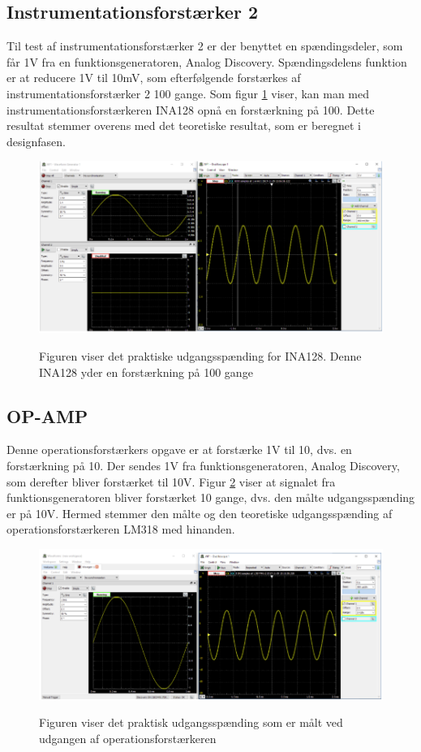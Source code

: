 \subsection{Instrumentationsforstærker 2}

Til test af instrumentationsforstærker 2 er der benyttet en spændingsdeler, som får 1V fra en funktionsgeneratoren, Analog Discovery. Spændingsdelens funktion er at reducere 1V til 10mV, som efterfølgende forstærkes af instrumentationsforstærker 2 100 gange. Som figur \ref{TestAfINA1282} viser, kan man med instrumentationsforstærkeren INA128 opnå en forstærkning på 100. Dette resultat stemmer overens med det teoretiske resultat, som er beregnet i designfasen.  

\begin{figure}[H] 
\centering
{\includegraphics[width=12cm]
{Figure/TestAfINA1282.PNG}}
\caption{Figuren viser det praktiske udgangsspænding for INA128. Denne INA128 yder en forstærkning på 100 gange}
\label{TestAfINA1282}
\end{figure}



\subsection{OP-AMP}

Denne operationsforstærkers opgave er at forstærke 1V til 10, dvs. en forstærkning på 10. Der sendes 1V fra funktionsgeneratoren, Analog Discovery, som derefter bliver forstærket til 10V. Figur \ref{TestAfOpAmp} viser at signalet fra funktionsgeneratoren bliver forstærket 10 gange, dvs. den målte udgangsspænding er på 10V. Hermed stemmer den målte og den teoretiske udgangsspænding af operationsforstærkeren LM318 med hinanden.  

\begin{figure}[H] 
\centering
{\includegraphics[width=14cm]
{Figure/TestOpamp.PNG}}
\caption{Figuren viser det praktisk udgangsspænding som er målt ved udgangen af operationsforstærkeren}
\label{TestAfOpAmp}
\end{figure}




